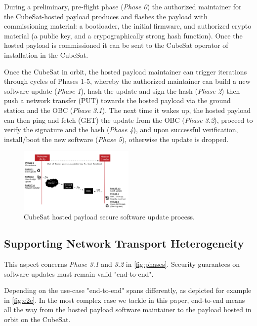 During a preliminary, pre-flight phase (\textit{Phase 0}) the authorized maintainer for the CubeSat-hosted payload
produces and flashes the payload with commissioning material:
a bootloader, the initial firmware, and authorized crypto material (a public key, and a crypographically strong hash function).
Once the hosted payload is commissioned it can be sent to the CubeSat operator of installation in the CubeSat.

Once the CubeSat in orbit, the hosted payload maintainer can trigger iterations through cycles of Phases 1-5, whereby
the authorized maintainer can build a new software update (\textit{Phase 1}), hash the update
and sign the hash (\textit{Phase 2}) then push a network transfer (PUT) towards the hosted payload via the ground station and the OBC (\textit{Phase 3.1}). The next time it wakes up, the hosted payload can
then ping and fetch (GET) the update from the OBC (\textit{Phase 3.2}), proceed to verify the signature and the hash (\textit{Phase 4}),
and upon successful verification, install/boot the new software (\textit{Phase 5}), otherwise the update is dropped.

\begin{figure}[t]
    \centering
    \includegraphics[width=0.5\textwidth]{Figures/CubeSat-Payload-update.png}
    \caption{CubeSat hosted payload secure software update process.}
    \label{fig:phases}
\end{figure}

\subsection{Supporting Network Transport Heterogeneity}
This aspect concerns \textit{Phase 3.1} and \textit{3.2} in \autoref{fig:phases}.  Security guarantees on software updates must remain valid "end-to-end".

Depending on the use-case "end-to-end" spans differently, as depicted for example in \autoref{fig:e2e}. In the most complex case we tackle in this paper, end-to-end means all the way from the hosted payload software maintainer to the payload hosted in orbit on the CubeSat.

